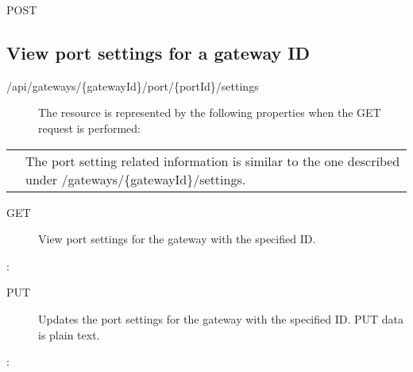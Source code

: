 \documentclass[letterpaper,10pt,english]{sphinxmanual}
\begin{document}
 POST


\subsection{View port settings for a gateway ID}
\label{\detokenize{restapi:view-port-settings-for-a-gateway-id}}
 /api/gateways/\{gatewayId\}/port/\{portId\}/settings
\begin{description}
\item[{}] \leavevmode
The resource is represented by the following properties when the GET request is performed:

\end{description}


\begin{savenotes}\sphinxattablestart
\centering
\begin{tabulary}{\linewidth}[t]{|T|T|}
\hline

&
\\
\hline
{}
&
The port setting related information is similar to the one described under /gateways/\{gatewayId\}/settings.
\\
\hline
\end{tabulary}
\par
\sphinxattableend\end{savenotes}
\begin{description}
\item[{ GET}] \leavevmode
View port settings for the gateway with the specified ID.

\end{description}

:

\begin{sphinxVerbatim}[commandchars=\\\{\}]
\end{sphinxVerbatim}
\begin{description}
\item[{ PUT}] \leavevmode
Updates the port settings for the gateway with the specified ID. PUT data is plain text.

\end{description}

:
\end{document}
